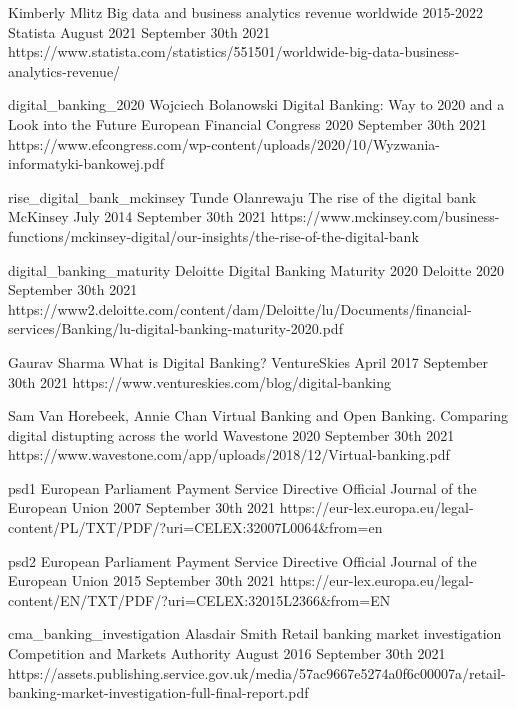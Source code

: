 
\begin{thebibliography}{100}

{Kimberly Mlitz}
{Big data and business analytics revenue worldwide 2015-2022}
{Statista}
{August 2021}
{September 30th 2021}
{https://www.statista.com/statistics/551501/worldwide-big-data-business-analytics-revenue/}

\onlinebibitem
{digital_banking_2020}
{Wojciech Bolanowski}
{Digital Banking: Way to 2020 and a Look into the Future}
{European Financial Congress}
{2020}
{September 30th 2021}
{https://www.efcongress.com/wp-content/uploads/2020/10/Wyzwania-informatyki-bankowej.pdf}

\onlinebibitem
{rise_digital_bank_mckinsey}
{Tunde Olanrewaju}
{The rise of the digital bank}
{McKinsey}
{July 2014}
{September 30th 2021}
{https://www.mckinsey.com/business-functions/mckinsey-digital/our-insights/the-rise-of-the-digital-bank}

\onlinebibitem
{digital_banking_maturity}
{Deloitte}
{Digital Banking Maturity 2020}
{Deloitte}
{2020}
{September 30th 2021}
{https://www2.deloitte.com/content/dam/Deloitte/lu/Documents/financial-services/Banking/lu-digital-banking-maturity-2020.pdf}

{Gaurav Sharma}
{What is Digital Banking?}
{VentureSkies}
{April 2017}
{September 30th 2021}
{https://www.ventureskies.com/blog/digital-banking}

{Sam Van Horebeek, Annie Chan}
{Virtual Banking and Open Banking. Comparing digital distupting across the world}
{Wavestone}
{2020}
{September 30th 2021}
{https://www.wavestone.com/app/uploads/2018/12/Virtual-banking.pdf}

\onlinebibitem
{psd1}
{European Parliament}
{Payment Service Directive}
{Official Journal of the European Union }
{2007}
{September 30th 2021}
{https://eur-lex.europa.eu/legal-content/PL/TXT/PDF/?uri=CELEX:32007L0064\&from=en}

\onlinebibitem
{psd2}
{European Parliament}
{Payment Service Directive}
{Official Journal of the European Union}
{2015}
{September 30th 2021}
{https://eur-lex.europa.eu/legal-content/EN/TXT/PDF/?uri=CELEX:32015L2366\&from=EN}

\onlinebibitem
{cma_banking_investigation}
{Alasdair Smith}
{Retail banking market investigation}
{Competition and Markets Authority}
{August 2016}
{September 30th 2021}
{https://assets.publishing.service.gov.uk/media/57ac9667e5274a0f6c00007a/retail-banking-market-investigation-full-final-report.pdf}


\end{thebibliography}
